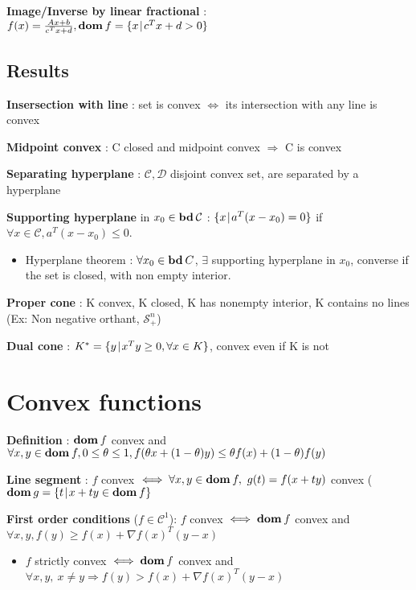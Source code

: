 \documentclass[a4paper, 10pt]{article}
\newcommand{\set}[2]{\{ #1 \hspace{.1em} | \hspace{.1em}#2 \}}
\newcommand{\grad}[1]{\nabla{#1}}
\newcommand{\Snp}{\mathcal{S}_{+}^n}
\newcommand{\bd}[1]{\textbf{bd}\hspace{0.2em}#1}
\newcommand{\dom}[1]{\textbf{dom}\hspace{0.2em}#1}
\newcommand{\itm}[1]{{\color{itmcolor} \textbf{#1}}}
\begin{document}
\itm{Image/Inverse by linear fractional} : $f(x) = \frac{A x + b}{c^T x + d}, \dom f = \set{x}{c^T x + d > 0}$

\subsection{Results}

\itm{Insersection with line} : set is convex $\iff$ its intersection with any line is convex

\itm{Midpoint convex} : C closed and midpoint convex $\Rightarrow$ C is convex

\itm{Separating hyperplane} : $\mathcal{C}, \mathcal{D}$ disjoint convex set, are separated by a hyperplane

\itm{Supporting hyperplane} in $x_0 \in \bd{\mathcal{C}}$ : $\set{x}{a^T (x - x_0) = 0}$ if $\forall x \in \mathcal{C}, a^T(x - x_0) \le 0$.

\begin{itemize}
\item Hyperplane theorem : $\forall x_0 \in \bd{C}$, $\exists$
  supporting hyperplane in $x_0$, converse if the set is closed, with
  non empty interior.
\end{itemize}
\itm{Proper cone} : K convex, K closed, K has nonempty interior, K contains no lines (Ex: Non negative orthant, $\Snp$)

\itm{Dual cone} : $K^* = \set{y}{x^T y \ge 0, \forall x \in K}$, convex even if K is not

\section{Convex functions}

\itm{Definition} : $\dom{f}$ convex and $\forall x, y \in \dom{f}, 0 \le \theta \le 1, f(\theta x + (1 - \theta) y) \le \theta f(x) + (1 - \theta) f(y)$

\itm{Line segment} : $f$ convex $\iff \forall x, y \in \dom{f},\ g(t) = f(x + t y) $ convex ($\dom{g} = \set{t}{x + t y \in \dom{f}}$

\itm{First order conditions} ($f \in \mathcal{C}^1$): $f$ convex $\iff \dom{f}$ convex and $\forall x, y, f(y) \ge f(x) + \grad{f}(x)^T (y - x)$
\begin{itemize}
\item $f$ strictly convex $\iff \dom{f}$ convex and $\forall x, y,\ x \ne y \Rightarrow f(y) > f(x) + \grad{f}(x)^T (y - x)$
\end{itemize}
\end{document}
